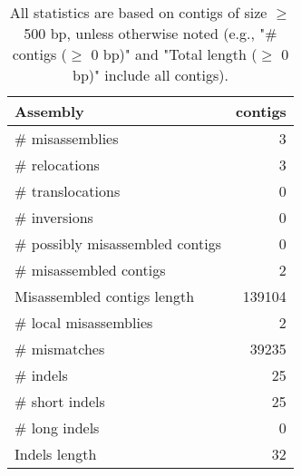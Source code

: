 \documentclass[12pt,a4paper]{article}
\begin{document}
\begin{table}[ht]
\begin{center}
\caption{All statistics are based on contigs of size $\geq$ 500 bp, unless otherwise noted (e.g., "\# contigs ($\geq$ 0 bp)" and "Total length ($\geq$ 0 bp)" include all contigs).}
\begin{tabular}{|l*{1}{|r}|}
\hline
Assembly & contigs \\ \hline
\# misassemblies & 3 \\ \hline
\hspace{5mm}\# relocations & 3 \\ \hline
\hspace{5mm}\# translocations & 0 \\ \hline
\hspace{5mm}\# inversions & 0 \\ \hline
\# possibly misassembled contigs & 0 \\ \hline
\# misassembled contigs & 2 \\ \hline
Misassembled contigs length & 139104 \\ \hline
\# local misassemblies & 2 \\ \hline
\# mismatches & 39235 \\ \hline
\# indels & 25 \\ \hline
\hspace{5mm}\# short indels & 25 \\ \hline
\hspace{5mm}\# long indels & 0 \\ \hline
Indels length & 32 \\ \hline
\end{tabular}
\end{center}
\end{table}
\end{document}

